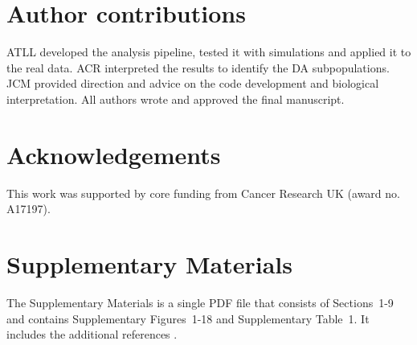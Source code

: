 \documentclass{article}
\newcommand{\suppoverclust}{9}
\newcommand{\suppfigclusterreal}{18}
\begin{document}
\section{Author contributions}
ATLL developed the analysis pipeline, tested it with simulations and applied it to the real data. 
ACR interpreted the results to identify the DA subpopulations.
JCM provided direction and advice on the code development and biological interpretation.
All authors wrote and approved the final manuscript.

\section{Acknowledgements}
This work was supported by core funding from Cancer Research UK (award no. A17197).

\section{Supplementary Materials}
The Supplementary Materials is a single PDF file that consists of Sections~1-\suppoverclust{} and contains Supplementary Figures~1-\suppfigclusterreal{} and Supplementary Table~1.
It includes the additional references \cite{lun2016delicious,robinson2010scaling,mccarthy2009treat}.



\end{document}
